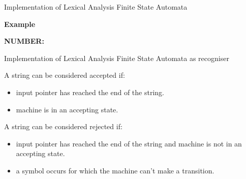\documentclass{beamer}
\newcommand{\myminorheader}[1]{
	{\color{BrickRed}
		\begin{Large}
			{\fontfamily{\sfdefault}\selectfont\textbf{#1}}
		\end{Large}
	}
}
\begin{document}
\begin{frame}{Implementation of Lexical Analysis}
{Finite State Automata}
\myminorheader{Example}

\textbf{NUMBER:}
\begin{center}

\end{center}

\end{frame}

\begin{frame}{Implementation of Lexical Analysis}
{Finite State Automata as recogniser}

A string can be considered accepted if:
\begin{scriptsize}
\begin{itemize}
\item input pointer has reached the end of the string.
\item machine is in an accepting state.
\end{itemize}
\end{scriptsize}
\pause
A string can be considered rejected if:
\begin{scriptsize}
\begin{itemize}
\item input pointer has reached the end of the string and machine is not in an accepting state.
\item a symbol occurs for which the machine can't make a transition.
\end{itemize}
\end{scriptsize}
\end{frame}
\end{document}

